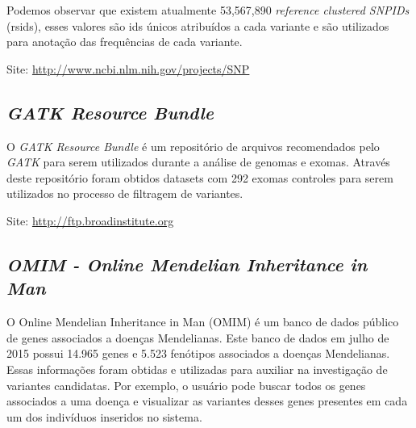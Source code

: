 
Podemos observar que existem atualmente 53,567,890 \textit{reference clustered SNPIDs} (rsids), esses valores são ids únicos atribuídos a cada variante e são utilizados para anotação das frequências de cada variante.

\noindent

Site: \url{http://www.ncbi.nlm.nih.gov/projects/SNP}

\subsection{\textit{GATK Resource Bundle}}
O \textit{GATK Resource Bundle} é um repositório de arquivos recomendados pelo \textit{GATK} para serem utilizados durante a análise de genomas e exomas. Através deste repositório foram obtidos datasets com 292 exomas controles para serem utilizados no processo de filtragem de variantes.
\noindent

Site: \url{http://ftp.broadinstitute.org}

\subsection{\textit{OMIM - Online Mendelian Inheritance in Man}}

O Online Mendelian Inheritance in Man (OMIM) é um banco de dados público de genes associados a doenças Mendelianas. Este banco de dados em julho de 2015 possui 14.965 genes e 5.523  fenótipos associados a doenças Mendelianas. Essas informações foram obtidas e utilizadas para auxiliar na investigação de variantes candidatas. Por exemplo, o usuário pode buscar todos os genes associados a uma doença e visualizar as variantes desses genes presentes em cada um dos indivíduos inseridos no sistema.
\noindent


